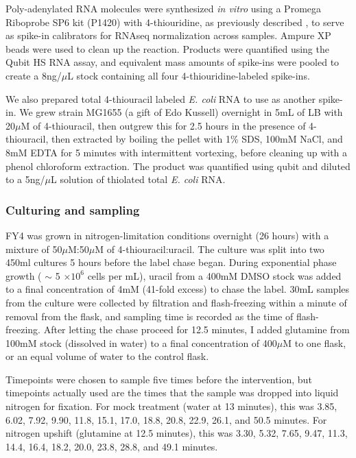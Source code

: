 Poly-adenylated RNA molecules were synthesized \emph{in vitro} using a
Promega Riboprobe SP6 kit (P1420) with 4-thiouridine, as previously
described \parencite{neymotin2014determination}, to serve as
spike-in calibrators for RNAseq normalization across samples.
Ampure XP beads were used to clean up the reaction.
Products were quantified using the Qubit HS RNA assay, and 
equivalent mass amounts of spike-ins were pooled to create a 
8ng/\(\mu\)L stock containing all four 4-thiouridine-labeled 
spike-ins.

We also prepared total 4-thiouracil labeled \emph{E. coli} RNA to 
use as another spike-in. We grew strain MG1655 (a gift of Edo Kussell)
overnight in 5mL of LB with 20\(\mu\)M of 4-thiouracil, then outgrew
this for 2.5 hours in the presence of 4-thiouracil, then extracted
by boiling the pellet with 1\% SDS, 100mM NaCl, and 8mM EDTA for 5
minutes with intermittent vortexing, before cleaning up with a phenol
chloroform extraction. The product was quantified using qubit and 
diluted to a 5ng/\(\mu\)L solution of thiolated total \emph{E. coli} 
RNA.

\subsubsection{Culturing and sampling}

FY4 was grown in nitrogen-limitation conditions overnight (26 hours) 
with a mixture of 50\(\mu\)M:50\(\mu\)M of 4-thiouracil:uracil. 
The culture was split into two 450ml cultures 5 hours before
the label chase began. During exponential phase growth ( \(\sim\) 5
\(\times 10^6\) cells per mL), uracil from a 400mM DMSO stock was added
to a final concentration of 4mM (41-fold excess) to chase the label.
30mL samples from the culture were collected by filtration and
flash-freezing within a minute of removal from the flask, and 
sampling time is recorded as the time of flash-freezing. 
After letting the chase proceed for 12.5 minutes, I added glutamine
from 100mM stock (dissolved in water) to a final concentration of
400\(\mu\)M to one flask, or an equal volume of water to the control
flask.

Timepoints were chosen to sample five times before the intervention,
but timepoints actually used are the times that the sample was dropped
into liquid nitrogen for fixation.
For mock treatment (water at 13 minutes), this was 
3.85, 6.02, 7.92, 9.90, 11.8, 15.1, 17.0, 18.8, 20.8, 22.9, 26.1, 
and 50.5 minutes. 
For nitrogen upshift (glutamine at 12.5 minutes), this was
3.30, 5.32, 7.65, 9.47, 11.3, 14.4, 16.4, 18.2, 20.0, 23.8, 28.8, 
and 49.1 minutes.

